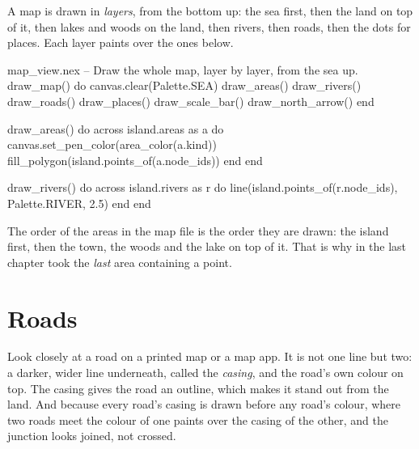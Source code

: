 A map is drawn in \emph{layers}, from the bottom up: the sea first, then
the land on top of it, then lakes and woods on the land, then rivers, then
roads, then the dots for places. Each layer paints over the ones below.

\begin{continued}{map_view.nex}
  -- Draw the whole map, layer by layer, from the sea up.
  draw_map() do
    canvas.clear(Palette.SEA)
    draw_areas()
    draw_rivers()
    draw_roads()
    draw_places()
    draw_scale_bar()
    draw_north_arrow()
  end

  draw_areas() do
    across island.areas as a do
      canvas.set_pen_color(area_color(a.kind))
      fill_polygon(island.points_of(a.node_ids))
    end
  end

  draw_rivers() do
    across island.rivers as r do
      line(island.points_of(r.node_ids), Palette.RIVER, 2.5)
    end
  end
\end{continued}

The order of the areas in the map file is the order they are drawn: the
island first, then the town, the woods and the lake on top of it. That is
why  in the last chapter took the \emph{last} area containing
a point.

\section{Roads}

Look closely at a road on a printed map or a map app. It is not one line
but two: a darker, wider line underneath, called the \emph{casing}, and
the road's own colour on top. The casing gives the road an outline, which
makes it stand out from the land. And because every road's casing is drawn
before any road's colour, where two roads meet the colour of one paints
over the casing of the other, and the junction looks joined, not crossed.

\begin{center}
\end{center}

